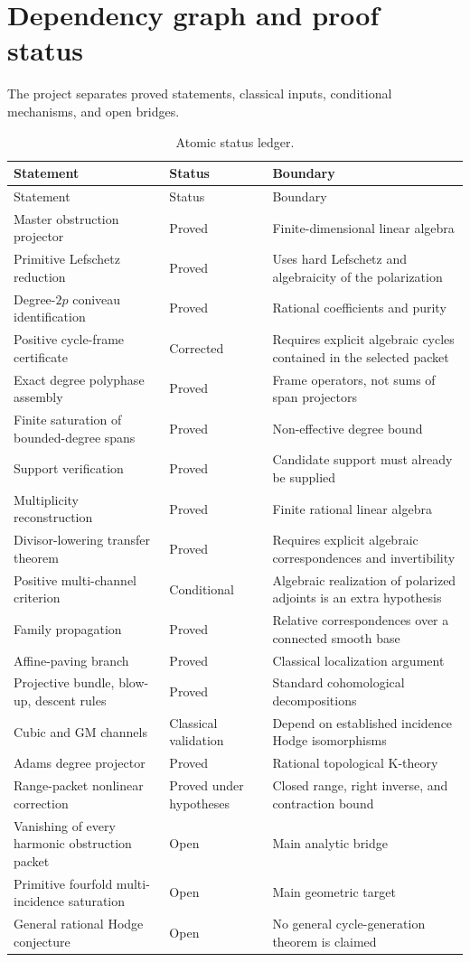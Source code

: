 \chapter{Dependency graph and proof status}
The project separates proved statements, classical inputs, conditional mechanisms, and open bridges.



\begin{longtable}{p{}p{}p{}}
\caption{Atomic status ledger.}\label{tab:status}\\
\toprule
Statement & Status & Boundary \\
\midrule
\endfirsthead
\toprule
Statement & Status & Boundary \\
\midrule
\endhead
Master obstruction projector & Proved & Finite-dimensional linear algebra \\
Primitive Lefschetz reduction & Proved & Uses hard Lefschetz and algebraicity of the polarization \\
Degree-$2p$ coniveau identification & Proved & Rational coefficients and purity \\
Positive cycle-frame certificate & Corrected & Requires explicit algebraic cycles contained in the selected packet \\
Exact degree polyphase assembly & Proved & Frame operators, not sums of span projectors \\
Finite saturation of bounded-degree spans & Proved & Non-effective degree bound \\
Support verification & Proved & Candidate support must already be supplied \\
Multiplicity reconstruction & Proved & Finite rational linear algebra \\
Divisor-lowering transfer theorem & Proved & Requires explicit algebraic correspondences and invertibility \\
Positive multi-channel criterion & Conditional & Algebraic realization of polarized adjoints is an extra hypothesis \\
Family propagation & Proved & Relative correspondences over a connected smooth base \\
Affine-paving branch & Proved & Classical localization argument \\
Projective bundle, blow-up, descent rules & Proved & Standard cohomological decompositions \\
Cubic and GM channels & Classical validation & Depend on established incidence Hodge isomorphisms \\
Adams degree projector & Proved & Rational topological K-theory \\
Range-packet nonlinear correction & Proved under hypotheses & Closed range, right inverse, and contraction bound \\
Vanishing of every harmonic obstruction packet & Open & Main analytic bridge \\
Primitive fourfold multi-incidence saturation & Open & Main geometric target \\
General rational Hodge conjecture & Open & No general cycle-generation theorem is claimed \\
\bottomrule
\end{longtable}
